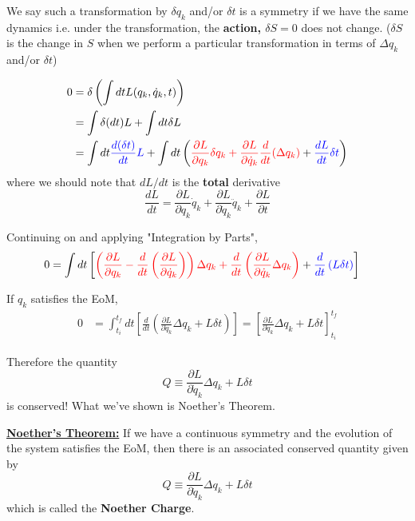 \documentclass[11pt]{article}
\begin{document}
\vskip 0.5cm
\begin{bluebox}
We say such a transformation by $\delta q_{k}$ and/or $\delta t$ is a symmetry if we have the same dynamics i.e. under the transformation, the \textbf{action, $\delta S = 0$} does not change.  ($\delta S$ is the change in $S$ when we perform a particular transformation in terms of $\Delta q_{k}$ and/or $\delta t$)
\end{bluebox}

\vskip 0.5cm
\begin{align*}
  0 &= \delta \left( \int dt L(q_{k}, \dot{q}_k, t)\right) \\
  &= \int \delta(dt) L + \int dt \delta L \\
  &= \int dt \color{blue}\frac{d(\delta t)}{dt} L \color{black} + \int dt \left( \color{red} \frac{\partial L}{\partial q_{k}} \delta q_{k} + \frac{\partial L}{\partial \dot{q}_{k}} \frac{d}{dt}( \Delta q_{k} ) \color{black} + \color{blue} \frac{dL}{dt} \delta t \color{black} \right)
\end{align*}
\vskip 0.5cm
where we should note that $dL/dt$ is the \textbf{total} derivative
\[ \frac{dL}{dt} = \frac{\partial L}{\partial q_{k}} \dot{q}_k  + \frac{\partial L}{\partial \dot{q}_{k}} \ddot{q}_k + \frac{\partial L}{\partial t} \]

\vskip 0.5cm
Continuing on and applying "Integration by Parts",
\begin{align*}
  0 &= \int dt \left[ \color{red} \left( \frac{\partial L}{\partial q_{k}} - \frac{d}{dt} \left( \frac{\partial L}{\partial \dot{q}_k} \right) \right) \Delta q_{k} + \frac{d}{dt} \left( \frac{\partial L}{\partial \dot{q}_{k}} \Delta q_{k} \right) \color{black} + \color{blue}\frac{d}{dt} \left( L \delta t \right) \color{black} \right]
\end{align*}

\vskip 0.5cm
If $q_k$ satisfies the EoM,
\begin{align*}
  0 &= \int_{t_i}^{t_f} dt \left[ \frac{d}{dt} \left( \frac{\partial L}{\partial \dot{q}_{k}} \Delta q_{k} + L \delta t\right) \right] = \left[ \frac{\partial L}{\partial \dot{q}_k} \Delta q_{k} + L \delta t \right]_{t_i}^{t_f}
\end{align*}

Therefore the quantity
\[ Q \equiv \frac{\partial L}{\partial \dot{q}_k} \Delta q_{k} + L \delta t  \]
is conserved! What we've shown is Noether's Theorem.

\vskip 0.5cm
\begin{bluebox}
  \underline{\textbf{Noether's Theorem:}}
  If we have a continuous symmetry and the evolution of the system satisfies the EoM, then there is an associated conserved quantity given by 
  \[ Q \equiv \frac{\partial L}{\partial \dot{q}_k} \Delta q_{k} + L \delta t  \]
  which is called the \textbf{Noether Charge}.
\end{bluebox}
\end{document}
